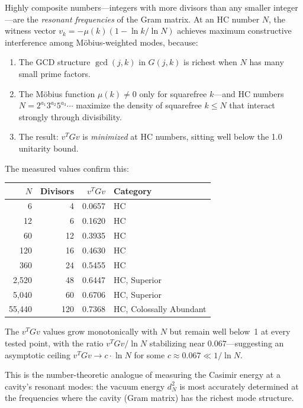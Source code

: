 \begin{principle}
\label{princ:resonant}
Highly composite numbers---integers with more divisors than any smaller
integer---are the \emph{resonant frequencies} of the Gram matrix.
At an HC number $N$, the witness vector $v_k = -\mu(k)(1 - \ln k / \ln N)$
achieves maximum constructive interference among Möbius-weighted modes,
because:
\begin{enumerate}
  \item The GCD structure $\gcd(j,k)$ in $G(j,k)$ is richest when $N$
    has many small prime factors.
  \item The Möbius function $\mu(k) \neq 0$ only for squarefree $k$---and
    HC numbers $N = 2^{a_1} 3^{a_2} 5^{a_3} \cdots$ maximize the density
    of squarefree $k \leq N$ that interact strongly through divisibility.
  \item The result: $v^T G v$ is \emph{minimized} at HC numbers,
    sitting well below the 1.0 unitarity bound.
\end{enumerate}

The measured values confirm this:

\begin{center}
\small
\begin{tabular}{@{}rrrl@{}}
\toprule
$N$ & Divisors & $v^T G v$ & Category \\
\midrule
6     & 4   & 0.0657 & HC \\
12    & 6   & 0.1620 & HC \\
60    & 12  & 0.3935 & HC \\
120   & 16  & 0.4630 & HC \\
360   & 24  & 0.5455 & HC \\
2{,}520  & 48  & 0.6447 & HC, Superior \\
5{,}040  & 60  & 0.6706 & HC, Superior \\
55{,}440 & 120 & 0.7368 & HC, Colossally Abundant \\
\bottomrule
\end{tabular}
\end{center}

The $v^T G v$ values grow monotonically with $N$ but remain
well below~1 at every tested point, with the ratio
$v^T G v / \ln N$ stabilizing near $0.067$---suggesting
an asymptotic ceiling $v^T G v \to c \cdot \ln N$ for
some $c \approx 0.067 \ll 1/\ln N$.

This is the number-theoretic analogue of measuring the
Casimir energy at a cavity's resonant modes: the vacuum
energy $d_N^2$ is most accurately determined at the
frequencies where the cavity (Gram matrix) has the richest
mode structure.
\end{principle}

